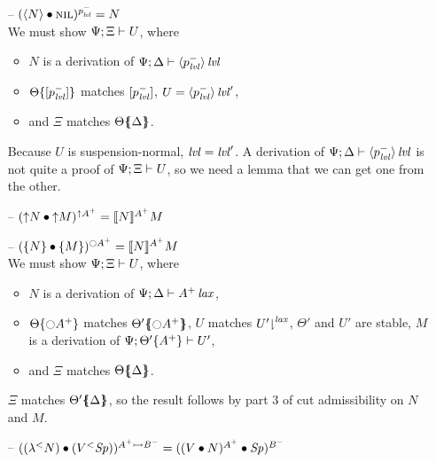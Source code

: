 \begin{itemize}
\item[--] $(\subst{\tetan{N}}{\tnil})^{p^-_\mlvl} = N$\smallskip\\
   We must show $\foc{\Psi}{\Xi}{U}$, where
   \begin{itemize}
   \item $N$ is a derivation of $\foc{\Psi}{\Delta}{\islvl{\susp{p^-_\mlvl}}}$
   \item $\tackon{\Theta}{[p^-_\mlvl]}$ matches $[p^-_\mlvl]$,
      $U = \islvl{\susp{p^-_\mlvl}}'$,
   \item and $\Xi$ matches $\frameoff{\Theta}{\Delta}$.
   \end{itemize}
   Because $U$ is suspension-normal, $\mlvl = \mlvl'$.
   A derivation of $\foc{\Psi}{\Delta}{\islvl{\susp{p^-_\mlvl}}}$ is not
   quite a proof of $\foc{\Psi}{\Xi}{U}$, so we need a lemma that 
   we can get one from the other. \smallskip

\item[--] $(\subst{\tupr{N}}{\tupl{M}})^{{\uparrow}A^+} = \lsubsta{N}{M}{A^+}$

\item[--] $(\subst{\tlaxr{N}}{\tlaxl{M}})^{{\ocircle}A^+}
           = \lsubsta{N}{M}{A^+}$\smallskip\\
  We must show $\foc{\Psi}{\Xi}{U}$, where
  \begin{itemize}
  \item $N$ is a derivation of 
     $\foc{\Psi}{\Delta}{\islax{A^+}}$, 
  \item $\tackon{\Theta}{{\ocircle}A^+}$ matches 
     $\frameoff{\Theta'}{{\ocircle}A^+}$, 
     $U$ matches $\restrictfrom{U'}{\mlax}$, 
     $\Theta'$ and $U'$ are stable, 
     $M$ is a derivation of $\foc{\Psi}{\tackon{\Theta'}{A^+}}{U'}$,
  \item and $\Xi$ matches $\frameoff{\Theta}{\Delta}$.
  \end{itemize}
  $\Xi$ matches $\frameoff{\Theta'}{\Delta}$, so the result follows
  by part 3 of cut admissibility on $N$ and $M$. \smallskip

\item[--] $(\subst{(\tlaml{N})}{(\tappl{V}{\Sp})})^{A^+ \lefti B^-}
           = (\subst{(\subst{V}{N})^{A^+}}{\Sp})^{B^-}$


\end{itemize}
